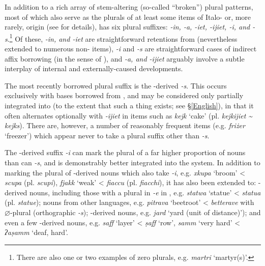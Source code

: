 \documentclass[output=paper]{langsci/langscibook}
\begin{document}
In addition to a rich array of stem-altering (so-called ``broken'') plural patterns, most of which also serve as the plurals of at least some items of Italo- or, more rarely,  origin (see \citealt{spagnol2011} for details),  has six plural suffixes: \textit{-in, -a, -iet, -ijiet, -i, \textnormal{and} -s}.\footnote{There are also one or two examples of zero plurals, e.g. \textit{martri} `martyr(s)'.} Of these, \textit{-in, \textnormal{and} -iet} are straightforward retentions from  (nevertheless extended to numerous non- items), \textit{-i} and \textit{-s} are straightforward cases of indirect affix borrowing (in the sense of \citealt{Seifart2015}), and \textit{-a, \textnormal{and} -ijiet} arguably involve a subtle interplay of internal and externally-caused developments.

The most recently borrowed plural suffix is the -derived \textit{-s}. This occurs exclusively with bases borrowed from , and may be considered only partially integrated into   (to the extent that such a thing exists; see §\ref{English}), in that it often alternates optionally with \textit{-ijiet} in items such as \textit{kejk} `cake' (pl. \textit{kejkijiet \textasciitilde \,kejks}). There are, however, a number of reasonably frequent items (e.g. \textit{friżer} `freezer') which appear never to take a plural suffix other than \textit{-s}.


The -derived suffix \textit{-i} can mark the plural of a far higher proportion of  nouns than can \textit{-s}, and is demonstrably better integrated into the   system. In addition to marking the plural of -derived nouns which also take \textit{-i}, e.g. \textit{xkupa} `broom' <  \textit{scupa} (pl. \textit{scupi}), \textit{fjakk} `weak' <  \textit{fiaccu} (pl. \textit{fiacchi}), it has also been extended to: -derived nouns, including those with a plural in \textit{-e} in , e.g. \textit{statwa} `statue' <  \textit{statua} (pl. \textit{statue}); nouns from other  languages, e.g. \textit{pitrava} `beetroot' <  \textit{betterave} with $\varnothing$-plural (orthographic \textit{-s}); -derived nouns, e.g. \textit{jard} `yard (unit of distance)'); and even a few -derived nouns, e.g. \textit{saff} `layer' < \textit{\d{s}aff} `row', \textit{samm} `very hard' < \textit{ʔa\d{s}amm} `deaf, hard'.
\end{document}
